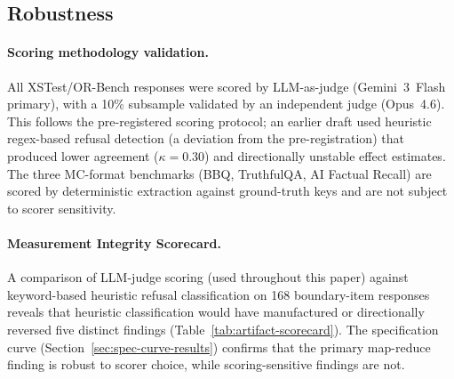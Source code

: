 \subsection{Robustness}
\label{sec:robustness}

\paragraph{Scoring methodology validation.}

\noindent
\begin{tcolorbox}[colback=blue!3, colframe=blue!40, title={Scoring Methodology: LLM-as-Judge Validation}, left=2mm, right=2mm, boxsep=2mm]
All XSTest/OR-Bench responses were scored by LLM-as-judge (Gemini~3~Flash primary), with a 10\% subsample validated by an independent judge (Opus~4.6).
This follows the pre-registered scoring protocol; an earlier draft used heuristic regex-based refusal detection (a deviation from the pre-registration) that produced lower agreement ($\kappa = 0.30$) and directionally unstable effect estimates.
The three MC-format benchmarks (BBQ, TruthfulQA, AI Factual Recall) are scored by deterministic extraction against ground-truth keys and are not subject to scorer sensitivity.
\end{tcolorbox}

\paragraph{Measurement Integrity Scorecard.}
\label{sec:artifact-scorecard}
\label{sec:scoring-validation}
\label{sec:judge_validation}
A comparison of LLM-judge scoring (used throughout this paper) against keyword-based heuristic refusal classification on 168 boundary-item responses reveals that heuristic classification would have manufactured or directionally reversed five distinct findings (Table~\ref{tab:artifact-scorecard}).  The specification curve (Section~\ref{sec:spec-curve-results}) confirms that the primary map-reduce finding is robust to scorer choice, while scoring-sensitive findings are not.

